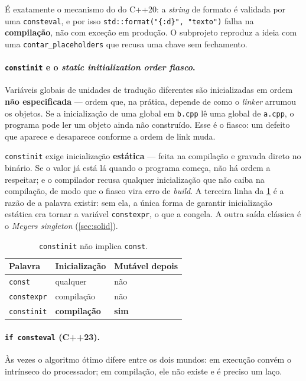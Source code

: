 É exatamente o mecanismo do  do C++20: a \emph{string} de
formato é validada por uma \texttt{consteval}, e por isso
\texttt{std::format("\{:d\}", "texto")} falha na \textbf{compilação}, não com
exceção em produção. O subprojeto reproduz a ideia com uma
\texttt{contar\_placeholders} que recusa uma chave sem fechamento.

\paragraph{\texttt{constinit} e o \emph{static initialization order fiasco}.}
Variáveis globais de unidades de tradução diferentes são inicializadas em ordem
\textbf{não especificada} --- ordem que, na prática, depende de como o
\emph{linker} arrumou os objetos. Se a inicialização de uma global em
\texttt{b.cpp} lê uma global de \texttt{a.cpp}, o programa pode ler um objeto
ainda não construído. Esse é o fiasco: um defeito que aparece e desaparece
conforme a ordem de link muda.

\texttt{constinit} exige inicialização \textbf{estática} --- feita na compilação
e gravada direto no binário. Se o valor já está lá quando o programa começa, não
há ordem a respeitar; e o compilador recusa qualquer inicialização que não caiba
na compilação, de modo que o fiasco vira erro de \emph{build}. A terceira linha
da \cref{tab:constinit} é a razão de a palavra existir: sem ela, a única forma
de garantir inicialização estática era tornar a variável \texttt{constexpr}, o
que a congela. A outra saída clássica é o \emph{Meyers singleton}
(\cref{sec:solid}).

\begin{table}[htbp]
\centering
\caption{\texttt{constinit} não implica \texttt{const}.}
\label{tab:constinit}
\footnotesize
\begin{tabular}{@{}lll@{}}
\toprule
\textbf{Palavra} & \textbf{Inicialização} & \textbf{Mutável depois} \\
\midrule
\texttt{const}     & qualquer            & não \\
\texttt{constexpr} & compilação          & não \\
\texttt{constinit} & \textbf{compilação} & \textbf{sim} \\
\bottomrule
\end{tabular}
\end{table}

\paragraph{\texttt{if consteval} (C++23).} Às vezes o algoritmo ótimo difere
entre os dois mundos: em execução convém o intrínseco do processador; em
compilação, ele não existe e é preciso um laço.

